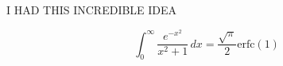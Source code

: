 I HAD THIS INCREDIBLE IDEA

\[
\int_{0}^{\infty} \frac{e^{-x^2}}{x^2 + 1} \, dx = \frac{\sqrt{\pi}}{2} \text{erfc}(1)
\]
